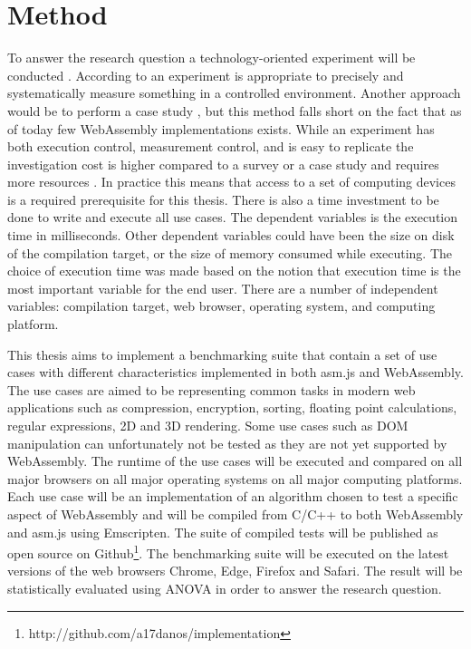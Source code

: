 \section{Method}
\label{method}

To answer the research question a technology-oriented experiment will be conducted \parencite{WohlinRunesonHostOhlssonRegnellWesslen2012}. According to \textcite{WohlinRunesonHostOhlssonRegnellWesslen2012} an experiment is appropriate to precisely and systematically measure something in a controlled environment. Another approach would be to perform a case study \parencite{WohlinRunesonHostOhlssonRegnellWesslen2012}, but this method falls short on the fact that as of today few WebAssembly implementations exists. While an experiment has both execution control, measurement control, and is easy to replicate the investigation cost is higher compared to a survey or a case study and requires more resources \parencite{WohlinRunesonHostOhlssonRegnellWesslen2012}. In practice this means that access to a set of computing devices is a required prerequisite for this thesis. There is also a time investment to be done to write and execute all use cases. The dependent variables is the execution time in milliseconds. Other dependent variables could have been the size on disk of the compilation target, or the size of memory consumed while executing. The choice of execution time was made based on the notion that execution time is the most important variable for the end user. There are a number of independent variables: compilation target, web browser, operating system, and computing platform.

This thesis aims to implement a benchmarking suite that contain a set of use cases with different characteristics implemented in both asm.js and WebAssembly. The use cases are aimed to be representing common tasks \parencite{WohlinRunesonHostOhlssonRegnellWesslen2012} in modern web applications such as compression, encryption, sorting, floating point calculations, regular expressions, 2D and 3D rendering. Some use cases such as DOM manipulation can unfortunately not be tested as they are not yet supported by WebAssembly. The runtime of the use cases will be executed and compared on all major browsers on all major operating systems on all major computing platforms. Each use case will be an implementation of an algorithm chosen to test a specific aspect of WebAssembly and will be compiled from C/C++ to both WebAssembly and asm.js using Emscripten. The suite of compiled tests will be published as open source on Github\footnote{http://github.com/a17danos/implementation}. The benchmarking suite will be executed on the latest versions of the web browsers Chrome, Edge, Firefox and Safari. The result will be statistically evaluated using ANOVA in order to answer the research question.

